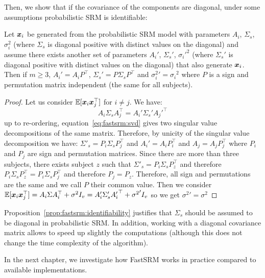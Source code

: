 Then, we show that if the covariance of the components are diagonal, under some
assumptions probabilistic SRM is identifiable:
\begin{prop}
  \label{prop:fastsrm:identifiability}
  Let $\boldsymbol{x}_i$ be generated from the probabilistic SRM model with parameters 
  $A_i$, $\Sigma_s$, $\sigma_i^2$ (where $\Sigma_s$ is diagonal positive with
  distinct values on the diagonal) and assume there exists another set of parameters $A_i'$, $\Sigma_s'$,
  ${\sigma_i'}^2$ (where $\Sigma_s'$ is diagonal positive with
  distinct values on the diagonal) that also generate $\boldsymbol{x}_i$.
Then if $m\geq 3$, $A_i' = A_i P^{\top}$, $\Sigma_s'= P\Sigma_sP^{\top}$ and
  ${\sigma_i^2}' = {\sigma_i}^2$ where $P$ is a sign and permutation matrix
  independent (the same for all subjects).
\end{prop}
\begin{proof}
  Let us consider $\mathbb{E}[\boldsymbol{x}_i \boldsymbol{x}_j^{\top}]$ for $i \neq j$.
  We have:
  \begin{equation}
  A_i \Sigma_s A_j^{\top} = A_i' \Sigma_s' {A_j'}^{\top}
  \label{eq:fastsrm:svd}
  \end{equation}
  up to re-ordering, equation~\eqref{eq:fastsrm:svd} gives two singular value
  decompositions of the same matrix.
  Therefore, by unicity of the singular value decomposition we have:
  $\Sigma'_s = P_i \Sigma_s P_j^{\top}$ and $A_i' = A_i P_i^{\top}$ and $A_j =
  A_j P_j^{\top}$ where $P_i$ and $P_j$ are sign and permutation matrices.
  Since there are more than three subjects, there exists subject $z$ such that
  $\Sigma'_s = P_i \Sigma_s P_z^{\top}$ and therefore
  $P_i \Sigma_s P_z^{\top} =  P_i \Sigma_s P_j^{\top}$ and therefore $P_j =
  P_z$. Therefore, all sign and permutations are the same and we call $P$ their
  common value.
  Then we consider
  $\mathbb{E}[\boldsymbol{x}_i \boldsymbol{x}_j^{\top}] = A_i \Sigma A_i^{\top} + \sigma^2 I_v = A_i' \Sigma_s'
  {A_i'}^{\top} + {\sigma^2}' I_v$
  so we get ${\sigma^2}' = {\sigma^2}$
\end{proof}

Proposition~\eqref{prop:fastsrm:identifiability} justifies that
$\Sigma_s$ should be assumed to be diagonal in probabilistic SRM.
In addition, working with a diagonal covariance matrix allows to speed up
slightly the computations (although this does not change the time complexity of
the algorithm).

In the next chapter, we investigate how FastSRM works in practice compared to
available implementations.
